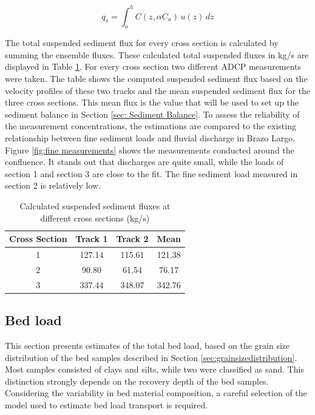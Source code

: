 \begin{equation}
    q_{s} = \int_{a}^{h} C(z, \alpha C_a) \, u(z) \, dz
    \label{eq: sediment flux formula}
\end{equation}

The total suspended sediment flux for every cross section is calculated by summing the ensemble fluxes. These calculated total suspended fluxes in kg/s are displayed in Table \ref{tab:Calculated suspended sediment flux}. For every cross section two different ADCP measurements were taken. The table shows the computed suspended sediment flux based on the velocity profiles of these two tracks and the mean suspended sediment flux for the three cross sections. This mean flux is the value that will be used to set up the sediment balance in Section \ref{sec: Sediment Balance}. To assess the reliability of the measurement concentrations, the estimations are compared to the existing relationship between fine sediment loads and fluvial discharge in Brazo Largo. Figure \ref{fig:fine measurements} shows the measurements conducted around the confluence. It stands out that discharges are quite small, while the loads of section 1 and section 3 are close to the fit. The fine sediment load measured in section 2 is relatively low.
 
\begin{table}[H]
    \centering
    \caption{Calculated suspended sediment fluxes at different cross sections (kg/s)}
    \label{tab:Calculated suspended sediment flux}
    \setlength{\tabcolsep}{8pt}
    \begin{tabular}{c c c c}
        \hline
        Cross Section & Track 1 & Track 2 & Mean\\
        \hline
        1 & 127.14 & 115.61 & 121.38\\
        2 & 90.80  & 61.54  & 76.17\\
        3 & 337.44 & 348.07 & 342.76\\
        \hline
    \end{tabular}
\end{table}

\subsection{Bed load}
\label{sec: Bed load}
This section presents estimates of the total bed load, based on the grain size distribution of the bed samples described in Section \ref{sec:grainsizedistribution}. Most samples consisted of clays and silts, while two were classified as sand. This distinction strongly depends on the recovery depth of the bed samples. Considering the variability in bed material composition, a careful selection of the model used to estimate bed load transport is required. 

